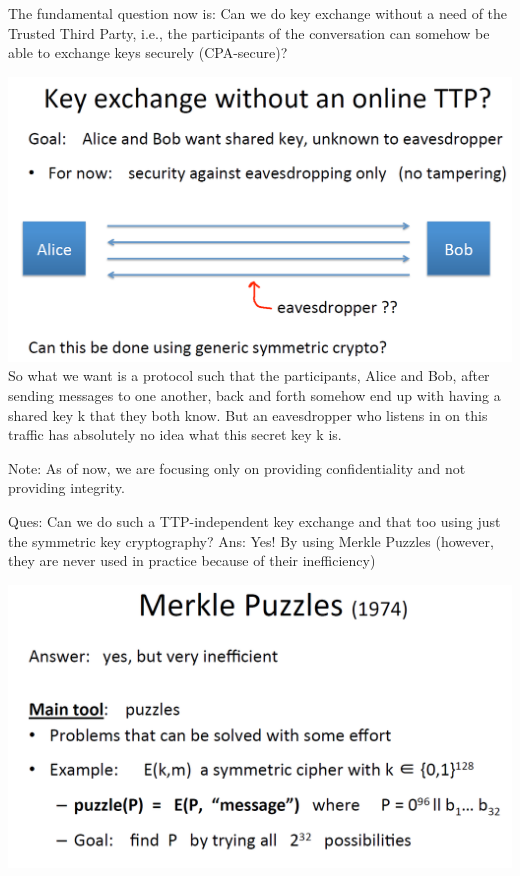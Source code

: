 \documentclass[11pt]{article}
\makeatletter
\def\maxwidth{\ifdim\Gin@nat@width>\linewidth\linewidth
    \else\Gin@nat@width\fi}
\let\Oldincludegraphics\includegraphics
\renewcommand{\includegraphics}[1]{\Oldincludegraphics[width=.8\maxwidth]{#1}}
\makeatother
\begin{document}
The fundamental question now is: Can we do key exchange without a need
of the Trusted Third Party, i.e., the participants of the conversation
can somehow be able to exchange keys securely (CPA-secure)?

\includegraphics{./Images/CanKeyEx-Symmetrically.png} So what we want is
a protocol such that the participants, Alice and Bob, after sending
messages to one another, back and forth somehow end up with having a
shared key k that they both know. But an eavesdropper who listens in on
this traffic has absolutely no idea what this secret key k is.

Note: As of now, we are focusing only on providing confidentiality and
not providing integrity.

Ques: Can we do such a TTP-independent key exchange and that too using
just the symmetric key cryptography? Ans: Yes! By using Merkle Puzzles
(however, they are never used in practice because of their inefficiency)

\includegraphics{./Images/MerklePuzzles.png}
\end{document}
